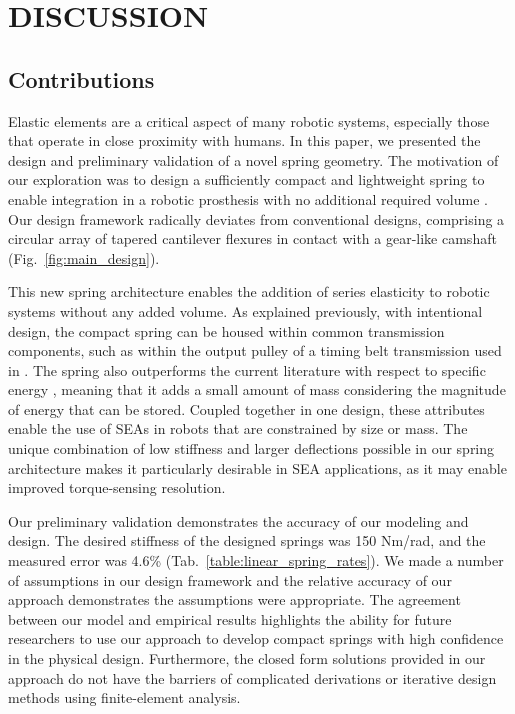 \documentclass[letterpaper, 10 pt, conference]{ieeeconf} %
\begin{document}
\section{DISCUSSION}
\subsection{Contributions}

    Elastic elements are a critical aspect of many robotic systems, especially those that operate in close proximity with humans. In this paper, we presented the design and preliminary validation of a novel spring geometry. The motivation of our exploration was to design a sufficiently compact and lightweight spring to enable integration in a robotic prosthesis with no additional required volume \cite{AzocarRouse2020}. Our design framework radically deviates from conventional designs, comprising a circular array of tapered cantilever flexures in contact with a gear-like camshaft (Fig.~\ref{fig:main_design}).

    This new spring architecture enables the addition of series elasticity to robotic systems without any added volume. As explained previously, with intentional design, the compact spring can be housed within common transmission components, such as within the output pulley of a timing belt transmission used in \cite{AzocarRouse2020}. The spring also outperforms the current literature with respect to specific energy \cite{DossantosCurinSiqueira2017CEP,CarpinoEA2012JMD,GeorgievBurdick2017IROS,TsagarakisLaffranchiVanderborghtCaldwell2009ICRA,Stienen2010TBME,AccotoEA2013IJARS,HerodotouWang2019ICORR,WangMeijnekeVanderkooij2013ICORR,KnoxSchmiedeler2009JMD,LagodaEA2010ICBRB}, meaning that it adds a small amount of mass considering the magnitude of energy that can be stored. Coupled together in one design, these attributes enable the use of SEAs in robots that are constrained by size or mass. The unique combination of low stiffness and larger deflections possible in our spring architecture makes it particularly desirable in SEA applications, as it may enable improved torque-sensing resolution.

    Our preliminary validation demonstrates the accuracy of our modeling and design. The desired stiffness of the designed springs was 150 Nm/rad, and the measured error was 4.6\% (Tab.~\ref{table:linear_spring_rates}). We made a number of assumptions in our design framework and the relative accuracy of our approach demonstrates the assumptions were appropriate. The agreement between our model and empirical results highlights the ability for future researchers to use our approach to develop compact springs with high confidence in the physical design. Furthermore, the closed form solutions provided in our approach do not have the barriers of complicated derivations or iterative design methods using finite-element analysis.
    
\end{document}

